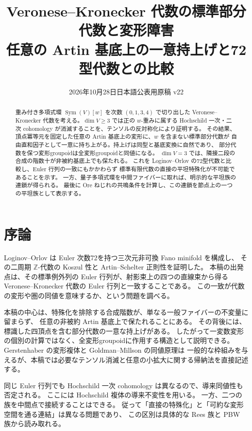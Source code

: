 
\title{Veronese--Kronecker 代数の標準部分代数と変形障害\\\large 任意の Artin 基底上の一意持上げと72型代数との比較}
\author{}\date{2026年10月28日\quad 日本語公表用原稿 v22}
\maketitle
\begin{abstract}
重み付き多項式環 $\operatorname{Sym}(V)[w]$ を次数 $(0,1,3,4)$ で切り出した
Veronese--Kronecker 代数を考える。$\dim V\ge3$ では正の $w$-重みに属する
Hochschild 一次・二次 cohomology が消滅することを、テンソルの反対称化により証明する。
その結果、頂点冪等元を固定した任意の Artin 基底上の変形に、$w$ を含まない標準部分代数が
自由直和因子として一意に持ち上がる。持上げは同型と基底変換に自然であり、
部分代数を保つ変形groupoidは全変形groupoidと同値になる。
$\dim V=3$ では、隣接二段の合成の階数十が非被約基底上でも保たれる。
これを Loginov--Orlov の72型代数と比較し、Euler 行列の一致にもかかわらず
標準有限代数の直接の平坦特殊化が不可能であることを示す。
一方、量子多項式環を中間ファイバーに取れば、明示的な平坦族の連鎖が得られる。
最後に Ore ねじれの共鳴条件を計算し、この連鎖を節点上の一つの平坦族として表示する。
\end{abstract}
\tableofcontents
\section{序論}
Loginov--Orlov は Euler 次数72を持つ三次元非可換 Fano minifold を構成し、
その二周期 $\mathbb Z$-代数の Koszul 性と Artin--Schelter 正則性を証明した\cite{LO}。
本稿の出発点は、その標準例外列の Euler 行列が、射影束上の四つの直線束から得る
Veronese--Kronecker 代数の Euler 行列と一致することである。
この一致が代数の変形や圏の同値を意味するか、という問題を調べる。

本稿の中心は、特殊化を排除する合成階数が、単なる一般ファイバーの不変量に留まらず、
任意の非被約 Artin 基底上で保たれることにある。
その背後には、標識した四頂点を含む部分代数の一意な持上げがある。
したがって一変数変形の個別の計算ではなく、全変形groupoidに作用する構造として説明できる。
Gerstenhaber の変形複体\cite{Gerstenhaber}と Goldman--Millson の同値原理\cite{GoldmanMillson}は
一般的な枠組みを与えるが、本稿では必要なテンソル消滅と任意の小拡大に関する帰納法を直接記述する。

同じ Euler 行列でも Hochschild 一次 cohomology は異なるので、導来同値性も否定される。
ここには Hochschild 複体の導来不変性\cite{Keller}を用いる。
一方、二つの族を中間点で接続することはできる。
従って「直接の特殊化」と「可約な変形空間を通る連結」は異なる問題であり、
この区別は具体的な Rees 族と PBW 族から読み取れる。

